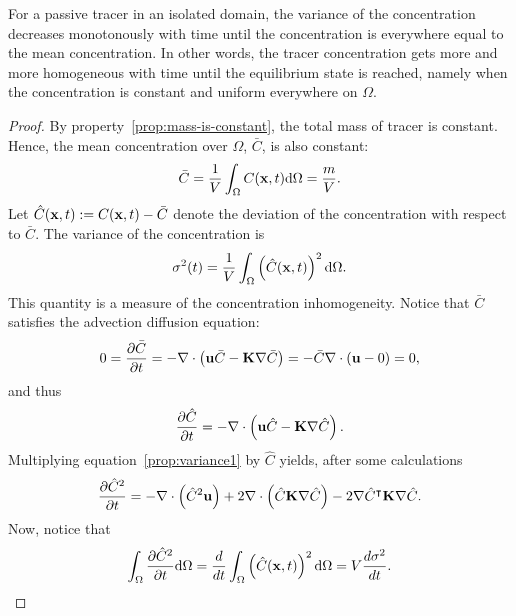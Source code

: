 \begin{property}
	For a passive tracer in an isolated domain, the variance of the concentration decreases monotonously with time until the concentration is everywhere equal to the mean concentration. In other words, the tracer concentration gets more and more homogeneous with time until the equilibrium state is reached, namely when the concentration is constant and uniform everywhere on $\Omega$.
\end{property}
\begin{proof}
	By property~\ref{prop:mass-is-constant}, the total mass of tracer is constant. Hence, the mean concentration over $\Omega$, $\bar C$, is also constant:
	\begin{equation}
	 	\bar C = \frac{1}{V} \int_{\Omega} C(\mathbf x,t) \mathrm d\Omega = \frac{m}{V}.
	 \end{equation} 
	 Let $\hat C(\mathbf x,t) := C(\mathbf x,t) - \bar C$ denote the deviation of the concentration with respect to $\bar C$. The variance of the concentration is
	 \begin{equation}
	 	\sigma^2(t) = \frac{1}{V} \int_{\Omega} \left(\hat C(\mathbf x,t)\right)^2 \mathrm d\Omega.
	 \end{equation}
	 This quantity is a measure of the concentration inhomogeneity. Notice that $\bar C$ satisfies the advection diffusion equation:
	 \begin{equation}
	 	0 = \frac{\partial \bar C}{\partial t} = -\nabla \cdot \left(\mathbf u \bar C - \mathbf K \nabla \bar C\right) = - \bar C \nabla \cdot (\mathbf u - 0) = 0,
	 \end{equation}
	 and thus
	 \begin{equation} \label{prop:variance1}
	 	\frac{\partial \hat C}{\partial t} = -\nabla \cdot \left(\mathbf u \hat C - \mathbf K \nabla \hat C\right).
	 \end{equation}
	 Multiplying equation~\eqref{prop:variance1} by $\hat C$ yields, after some calculations
	 \begin{equation} \label{prop:variance2}
	 	\frac{\partial \hat C^2}{\partial t} = - \nabla \cdot \left(\hat C^2 \mathbf u \right) + 2\nabla \cdot \left(\hat C \mathbf K \nabla \hat C \right) - 2 \nabla \hat C^\intercal \mathbf K \nabla \hat C.
	 \end{equation}
	 Now, notice that
	 \begin{equation} \label{prop:variance3}
	 	\int_{\Omega} \frac{\partial \hat C^2}{\partial t} \mathrm d\Omega = \frac{d}{dt} \int_{\Omega} \left( \hat C(\mathbf x,t) \right)^2 \mathrm d\Omega = V\frac{d\sigma^2}{dt}.
	 \end{equation}

\end{proof}
